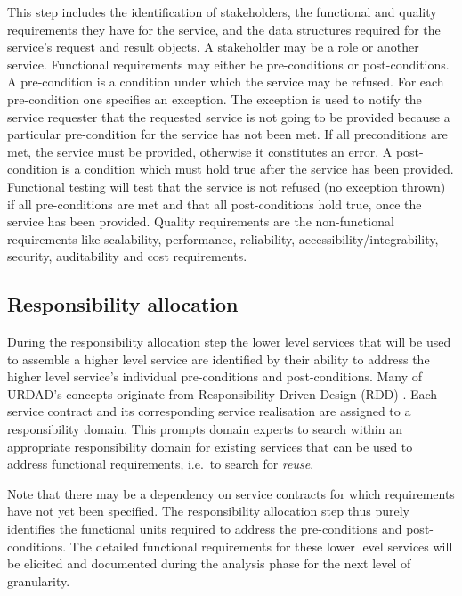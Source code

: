 This step includes the identification of stakeholders, the functional and quality requirements they have for the service, and the data structures required for the service's request and result objects. A stakeholder may be a role or another service. Functional requirements may either be pre-conditions or  post-conditions. A pre-condition is a condition under which the service may be refused. For each pre-condition one specifies an exception. The exception is used to notify the service requester that the requested service is not going to be provided because a particular pre-condition for the service has not been met. If all preconditions are met, the service must be provided, otherwise it constitutes an error. A post-condition is a condition which must hold true after the service has been provided. Functional testing will test that the service is not refused (no exception thrown) if all pre-conditions are met and that all post-conditions hold true, once the service has been provided. Quality requirements are the non-functional requirements like scalability, performance, reliability, accessibility/integrability, security, auditability and cost requirements. 

\subsection{Responsibility allocation}

During the responsibility allocation step the lower level services that will be used to assemble a higher level service are identified by their ability to address the higher level service's individual pre-conditions and post-conditions. Many of URDAD's concepts originate from Responsibility Driven Design (RDD) \cite{wirfs-brock_object-oriented_1989,wirfs-brock_object_2002}. Each service contract and its corresponding service realisation are assigned to a responsibility domain. This prompts domain experts to search within an appropriate responsibility domain for existing services that can be used to address functional requirements, i.e.\ to search for \emph{reuse}.

Note that there may be a dependency on service contracts for which requirements have not yet been specified. The responsibility allocation step thus purely identifies the functional units required to address the pre-conditions and post-conditions. The detailed functional requirements for these lower level services will be elicited and documented during the analysis phase for the next level of granularity.  

